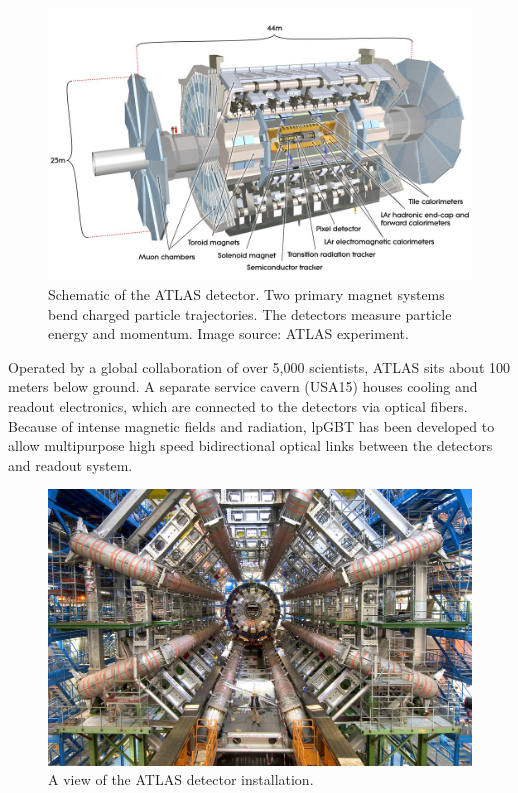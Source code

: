 \begin{figure}[H]
\centering
\includegraphics[width=\textwidth]{images/introduction/atlas-model.jpg}
\caption{Schematic of the \acs{ATLAS} detector. Two primary magnet systems bend charged particle trajectories. The detectors measure particle energy and momentum. Image source: \acs{ATLAS} experiment. \protect\cite{atlas-experiment}}
\label{fig:atlas-model}
\end{figure}

Operated by a global collaboration of over 5,000 scientists, \acs{ATLAS} sits about 100 meters below ground. A separate service cavern (USA15) houses cooling and readout electronics, which are connected to the detectors via optical fibers. Because of intense magnetic fields and radiation, \acs{lpGBT} \cite{lpgbt} has been developed to allow multipurpose high speed bidirectional optical links between the detectors and readout system.

\begin{figure}[H]
\centering
\includegraphics[width=\textwidth]{images/introduction/atlas.jpg}
\caption{A view of the ATLAS detector installation. \protect\cite{atlas-experiment}}
\label{fig:atlas}
\end{figure}

